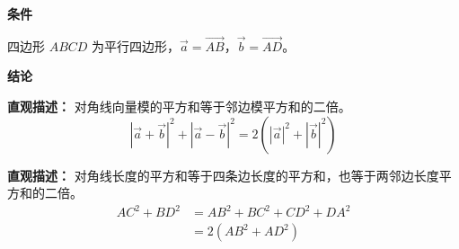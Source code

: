 \begin{statementbox}
	\textbf{\textcolor{CStatement}{条件}}
	\begin{description}[style=nextline, leftmargin=2.8em, labelsep=0.5em, itemsep=0.35em]
		\item[\textbf{\textcolor{CStatement}{条件 1（四边形条件）：}}] 四边形 $ABCD$ 为平行四边形，$\vec{a}=\overrightarrow{AB}$，$\vec{b}=\overrightarrow{AD}$。
	\end{description}

	\textbf{\textcolor{CStatement}{结论}}
	\begin{description}[style=nextline, leftmargin=2.8em, labelsep=0.5em, itemsep=0.45em]
		\item[\textbf{\textcolor{CStatement}{结论一（向量恒等式）：}}]
			\textbf{\textcolor{CStatement}{直观描述：}}
			对角线向量模的平方和等于邻边模平方和的二倍。
			\[
				|\vec{a}+\vec{b}|^2 + |\vec{a}-\vec{b}|^2 = 2(|\vec{a}|^2 + |\vec{b}|^2)
			\]

		\item[\textbf{\textcolor{CStatement}{推广结论（边长关系）：}}]
			\textbf{\textcolor{CStatement}{直观描述：}}
			对角线长度的平方和等于四条边长度的平方和，也等于两邻边长度平方和的二倍。
			\[
				\begin{aligned}
					AC^2+BD^2 &= AB^2+BC^2+CD^2+DA^2 \\
					&= 2(AB^2+AD^2)
			\end{aligned}
			\]
	\end{description}
\end{statementbox}
